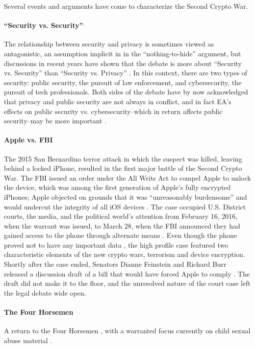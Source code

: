 Several events and arguments have come to characterize the Second Crypto War.

\paragraph*{``Security vs. Security''} The relationship between security and privacy is sometimes viewed as antagonistic,
an assumption implicit in in the ``nothing-to-hide'' argument, but discussions in recent years have shown that the
debate is more about ``Security vs. Security'' than ``Security vs. Privacy'' \cite{stalla_bourdillon_privacy_2014}. In
this context, there are two types of security: public security, the pursuit of law enforcement, and cybersecurity, the
pursuit of tech professionals. Both sides of the debate have by now acknowledged that privacy and public security are
not always in conflict, and in fact EA's effects on public security vs. cybersecurity--which in return affects public
security--may be more important \cite{schneier_2019}.

\paragraph*{Apple vs. FBI} The 2015 San Bernardino terror attack in which the suspect was killed, leaving behind a
locked iPhone, resulted in the first major battle of the Second Crypto War. The FBI issued an order under the All Writs
Act to compel Apple to unlock the device, which was among the first generation of Apple's fully encrypted iPhones; Apple
objected on grounds that it was ``unreasonably burdensome'' and would undercut the integrity of all iOS devices
\cite{schulze_clipper_2017}. The case occupied U.S. District courts, the media, and the political world's attention from
February 16, 2016, when the warrant was issued, to March 28, when the FBI announced they had gained access to the phone
through alternate means \cite{novet_2016}. Even though the phone proved not to have any important data
\cite{schulze_clipper_2017}, the high profile case featured two characteristic elements of the new crypto wars,
terrorism and device encryption. Shortly after the case ended, Senators Dianne Feinstein and Richard Burr released a
discussion draft of a bill that would have forced Apple to comply \cite{burr_2016}. The draft did not make it to the
floor, and the unresolved nature of the court case left the legal debate wide open.

\paragraph*{The Four Horsemen} A return to the Four Horsemen \cite{schneier_scaring_2019}, with a warranted focus
currently on child sexual abuse material \cite{keller_internet_2019} \cite{geller_2019}.

